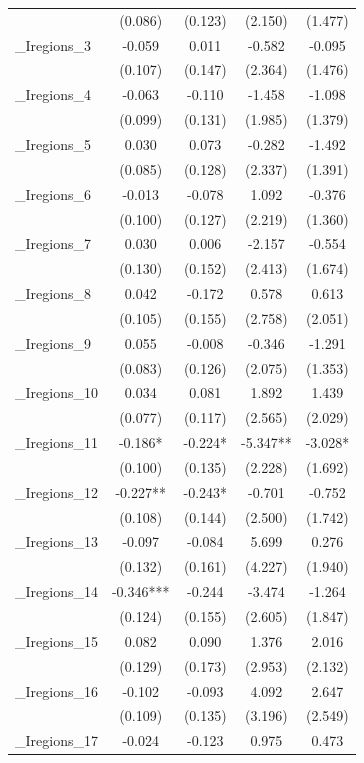 \documentclass[]{article}
\begin{document}
\begin{tabular}{lcccc}
 & (0.086) & (0.123) & (2.150) & (1.477) \\
\_Iregions\_3 & -0.059 & 0.011 & -0.582 & -0.095 \\
 & (0.107) & (0.147) & (2.364) & (1.476) \\
\_Iregions\_4 & -0.063 & -0.110 & -1.458 & -1.098 \\
 & (0.099) & (0.131) & (1.985) & (1.379) \\
\_Iregions\_5 & 0.030 & 0.073 & -0.282 & -1.492 \\
 & (0.085) & (0.128) & (2.337) & (1.391) \\
\_Iregions\_6 & -0.013 & -0.078 & 1.092 & -0.376 \\
 & (0.100) & (0.127) & (2.219) & (1.360) \\
\_Iregions\_7 & 0.030 & 0.006 & -2.157 & -0.554 \\
 & (0.130) & (0.152) & (2.413) & (1.674) \\
\_Iregions\_8 & 0.042 & -0.172 & 0.578 & 0.613 \\
 & (0.105) & (0.155) & (2.758) & (2.051) \\
\_Iregions\_9 & 0.055 & -0.008 & -0.346 & -1.291 \\
 & (0.083) & (0.126) & (2.075) & (1.353) \\
\_Iregions\_10 & 0.034 & 0.081 & 1.892 & 1.439 \\
 & (0.077) & (0.117) & (2.565) & (2.029) \\
\_Iregions\_11 & -0.186* & -0.224* & -5.347** & -3.028* \\
 & (0.100) & (0.135) & (2.228) & (1.692) \\
\_Iregions\_12 & -0.227** & -0.243* & -0.701 & -0.752 \\
 & (0.108) & (0.144) & (2.500) & (1.742) \\
\_Iregions\_13 & -0.097 & -0.084 & 5.699 & 0.276 \\
 & (0.132) & (0.161) & (4.227) & (1.940) \\
\_Iregions\_14 & -0.346*** & -0.244 & -3.474 & -1.264 \\
 & (0.124) & (0.155) & (2.605) & (1.847) \\
\_Iregions\_15 & 0.082 & 0.090 & 1.376 & 2.016 \\
 & (0.129) & (0.173) & (2.953) & (2.132) \\
\_Iregions\_16 & -0.102 & -0.093 & 4.092 & 2.647 \\
 & (0.109) & (0.135) & (3.196) & (2.549) \\
\_Iregions\_17 & -0.024 & -0.123 & 0.975 & 0.473 \\

\end{tabular}
\end{document}
